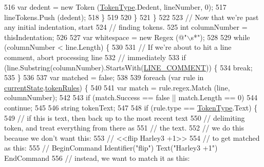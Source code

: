 \begin{DoxyCode}
516                         var dedent = \textcolor{keyword}{new} Token (\hyperlink{a00026_a301aa7c866593a5b625a8fc158bbeace}{TokenType}.Dedent, lineNumber, 0);
517                         lineTokens.Push (dedent);
518                     \}
519 
520                 \}
521             \}
522 
523             \textcolor{comment}{// Now that we're past any initial indentation, start}
524             \textcolor{comment}{// finding tokens.}
525             \textcolor{keywordtype}{int} columnNumber = thisIndentation;
526 
527             var whitespace = \textcolor{keyword}{new} Regex (\textcolor{stringliteral}{@"\(\backslash\)s*"});
528 
529             \textcolor{keywordflow}{while} (columnNumber < line.Length) \{
530 
531                 \textcolor{comment}{// If we're about to hit a line comment, abort processing line}
532                 \textcolor{comment}{// immediately}
533                 \textcolor{keywordflow}{if} (line.Substring(columnNumber).StartsWith(\hyperlink{a00047_a29c457125cc4876f8571f5d9afa372e2}{LINE\_COMMENT})) \{
534                     \textcolor{keywordflow}{break};
535                 \}
536 
537                 var matched = \textcolor{keyword}{false};
538 
539                 \textcolor{keywordflow}{foreach} (var rule \textcolor{keywordflow}{in} \hyperlink{a00047_ac90b7dce8103425a148f9e8588f14137}{currentState}.\hyperlink{a00048_adf6563b1dc6f3ef80ed13c2b15b7be03}{tokenRules}) \{
540                     
541                     var match = rule.regex.Match (line, columnNumber);
542 
543                     \textcolor{keywordflow}{if} (match.Success == \textcolor{keyword}{false} || match.Length == 0)
544                         \textcolor{keywordflow}{continue};
545 
546                     \textcolor{keywordtype}{string} tokenText;
547 
548                     \textcolor{keywordflow}{if} (rule.type == \hyperlink{a00026_a301aa7c866593a5b625a8fc158bbeace}{TokenType}.Text) \{
549                         \textcolor{comment}{// if this is text, then back up to the most recent text }
550                         \textcolor{comment}{// delimiting token, and treat everything from there as}
551                         \textcolor{comment}{// the text.}
552                         \textcolor{comment}{// we do this because we don't want this:}
553                         \textcolor{comment}{//    <<flip Harley3 +1>>}
554                         \textcolor{comment}{// to get matched as this:}
555                         \textcolor{comment}{//    BeginCommand Identifier("flip") Text("Harley3 +1") EndCommand}
556                         \textcolor{comment}{// instead, we want to match it as this:}

\end{DoxyCode}
